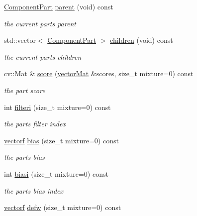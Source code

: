 \begin{DoxyCompactItemize}
\hyperlink{classComponentPart}{Component\+Part} \hyperlink{classComponentPart_a563956730a05cb34cc41278b6df1fa81}{parent} (void) const 
\begin{DoxyCompactList}\small\item\em the current part\textquotesingle{}s parent \end{DoxyCompactList}\item 
std\+::vector$<$ \hyperlink{classComponentPart}{Component\+Part} $>$ \hyperlink{classComponentPart_acfa581b85329b7bf7eb4d10c2552db57}{children} (void) const 
\begin{DoxyCompactList}\small\item\em the current part\textquotesingle{}s children \end{DoxyCompactList}\item 
cv\+::\+Mat \& \hyperlink{classComponentPart_a4b037c9e270a104116dd5f886c959006}{score} (\hyperlink{types_8hpp_a3207a7addcfa415d1c83622febcb1e9b}{vector\+Mat} \&scores, size\+\_\+t mixture=0) const 
\begin{DoxyCompactList}\small\item\em the part score \end{DoxyCompactList}\item 
int \hyperlink{classComponentPart_a93c4898f36cdcc92fe038ec1530b1d57}{filteri} (size\+\_\+t mixture=0) const 
\begin{DoxyCompactList}\small\item\em the part\textquotesingle{}s filter index \end{DoxyCompactList}\item 
\hyperlink{types_8hpp_a4da5db3ee9e284f719ef5764dbadffc8}{vectorf} \hyperlink{classComponentPart_ab52f0f978c3e01c2186e5a8c69f9a09a}{bias} (size\+\_\+t mixture=0) const 
\begin{DoxyCompactList}\small\item\em the part\textquotesingle{}s bias \end{DoxyCompactList}\item 
int \hyperlink{classComponentPart_a8c5fde49dae3ab679454a106a9e41be8}{biasi} (size\+\_\+t mixture=0) const 
\begin{DoxyCompactList}\small\item\em the part\textquotesingle{}s bias index \end{DoxyCompactList}\item 
\hyperlink{types_8hpp_a4da5db3ee9e284f719ef5764dbadffc8}{vectorf} \hyperlink{classComponentPart_a9dfb0fd739381be92d5ce2eab5054681}{defw} (size\+\_\+t mixture=0) const 

\end{DoxyCompactItemize}
